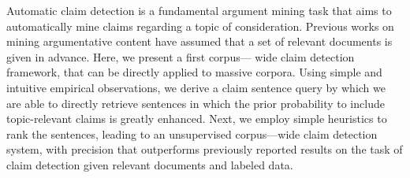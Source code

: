 Automatic claim detection is a fundamental argument mining task that aims to automatically mine claims regarding a topic of consideration. Previous works on mining argumentative content have assumed that a set of relevant documents is given in advance. Here, we present a first corpus--- wide claim detection framework, that can be directly applied to massive corpora. Using simple and intuitive empirical observations, we derive a claim sentence query by which we are able to directly retrieve sentences in which the prior probability to include topic-relevant claims is greatly enhanced. Next, we employ simple heuristics to rank the sentences, leading to an unsupervised corpus---wide claim detection system, with precision that outperforms previously reported results on the task of claim detection given relevant documents and labeled data.
